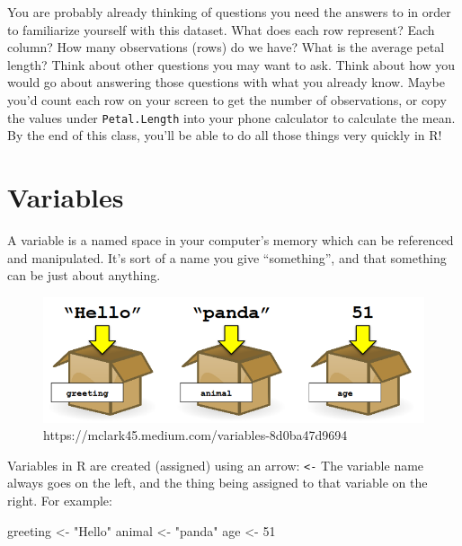 \documentclass[
  letterpaper,
  DIV=11,
  numbers=noendperiod]{scrreprt}
\newenvironment{Shaded}{\begin{snugshade}}{\end{snugshade}}
\newcommand{\DecValTok}[1]{\textcolor[rgb]{0.68,0.00,0.00}{#1}}
\newcommand{\NormalTok}[1]{\textcolor[rgb]{0.00,0.23,0.31}{#1}}
\newcommand{\OtherTok}[1]{\textcolor[rgb]{0.00,0.23,0.31}{#1}}
\newcommand{\StringTok}[1]{\textcolor[rgb]{0.13,0.47,0.30}{#1}}
\begin{document}
You are probably already thinking of questions you need the answers to
in order to familiarize yourself with this dataset. What does each row
represent? Each column? How many observations (rows) do we have? What is
the average petal length? Think about other questions you may want to
ask. Think about how you would go about answering those questions with
what you already know. Maybe you'd count each row on your screen to get
the number of observations, or copy the values under
\texttt{Petal.Length} into your phone calculator to calculate the mean.
By the end of this class, you'll be able to do all those things very
quickly in R!

\hypertarget{variables}{%
\section{Variables}\label{variables}}

A variable is a named space in your computer's memory which can be
referenced and manipulated. It's sort of a name you give ``something'',
and that something can be just about anything.

\begin{figure}

{\centering \includegraphics{scripts/01_codingBasics/class1-files/variables.png}

}

\caption{https://mclark45.medium.com/variables-8d0ba47d9694}

\end{figure}

Variables in R are created (assigned) using an arrow:
\texttt{\textless{}-} The variable name always goes on the left, and the
thing being assigned to that variable on the right. For example:

\begin{Shaded}
\begin{Highlighting}[]
\NormalTok{greeting }\OtherTok{\textless{}{-}} \StringTok{"Hello"}
\NormalTok{animal }\OtherTok{\textless{}{-}} \StringTok{"panda"}
\NormalTok{age }\OtherTok{\textless{}{-}} \DecValTok{51}
\end{Highlighting}
\end{Shaded}
\end{document}
